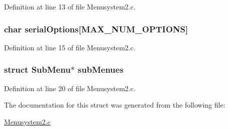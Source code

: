 Definition at line 13 of file Menusystem2.\+c.

\hypertarget{struct_sub_menu_adcfcbb5b5340baf34c70fb8f4cc66f72}{
\subsubsection[{serial\+Options}]{\setlength{\rightskip}{0pt plus 5cm}char serial\+Options\mbox{[}{\bf M\+A\+X\+\_\+\+N\+U\+M\+\_\+\+O\+P\+T\+I\+O\+N\+S}\mbox{]}}}\label{struct_sub_menu_adcfcbb5b5340baf34c70fb8f4cc66f72}


Definition at line 15 of file Menusystem2.\+c.

\hypertarget{struct_sub_menu_a915aa121e09e4c3f914dc59727f390e3}{
\subsubsection[{sub\+Menues}]{\setlength{\rightskip}{0pt plus 5cm}struct {\bf Sub\+Menu}$\ast$ sub\+Menues}}\label{struct_sub_menu_a915aa121e09e4c3f914dc59727f390e3}


Definition at line 20 of file Menusystem2.\+c.



The documentation for this struct was generated from the following file\+:\begin{DoxyCompactItemize}
\item 
\hyperlink{_menusystem2_8c}{Menusystem2.\+c}\end{DoxyCompactItemize}
